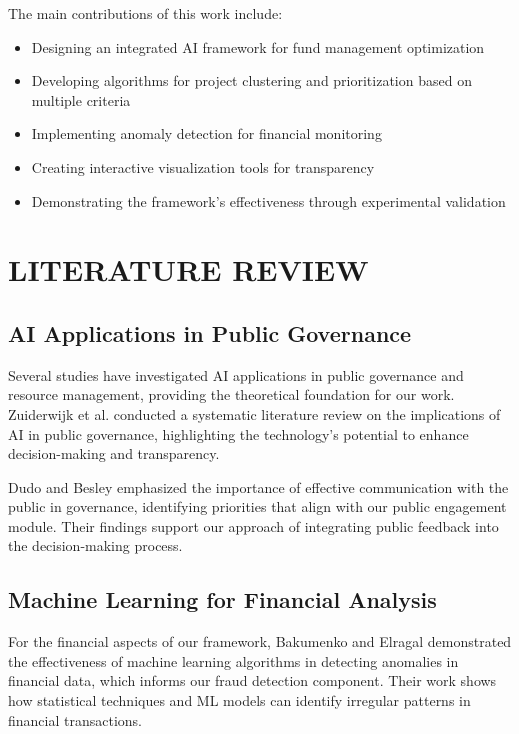 \documentclass[12pt,a4paper]{report}
\begin{document}
\noindent The main contributions of this work include:
\begin{itemize}
    \item Designing an integrated AI framework for fund management optimization
    \item Developing algorithms for project clustering and prioritization based on multiple criteria
    \item Implementing anomaly detection for financial monitoring
    \item Creating interactive visualization tools for transparency
    \item Demonstrating the framework's effectiveness through experimental validation
\end{itemize}

\chapter{LITERATURE REVIEW}

\section{AI Applications in Public Governance}
\indent \indent Several studies have investigated AI applications in public governance and resource management, providing the theoretical foundation for our work. Zuiderwijk et al. \cite{zuiderwijk2021} conducted a systematic literature review on the implications of AI in public governance, highlighting the technology's potential to enhance decision-making and transparency.

\noindent Dudo and Besley \cite{dudo2016} emphasized the importance of effective communication with the public in governance, identifying priorities that align with our public engagement module. Their findings support our approach of integrating public feedback into the decision-making process.

\section{Machine Learning for Financial Analysis}
\indent \indent For the financial aspects of our framework, Bakumenko and Elragal \cite{bakumenko2022} demonstrated the effectiveness of machine learning algorithms in detecting anomalies in financial data, which informs our fraud detection component. Their work shows how statistical techniques and ML models can identify irregular patterns in financial transactions.
\end{document}
